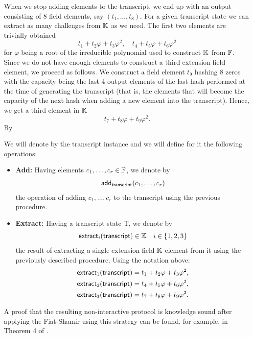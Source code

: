 When we stop adding elements to the transcript, we end up with an output consisting of $8$ field elements, say $(t_1, \dots, t_8)$. For a given transcript state we can extract as many challenges from $\mathbb{K}$ as we need. The first two elements are trivially obtained
\[
t_1 + t_2 \varphi + t_3 \varphi^2, \quad t_4 + t_5 \varphi + t_6 \varphi^2
\]
for $\varphi$ being a root of the irreducible polynomial used to construct $\mathbb{K}$ from $\mathbb{F}$. Since we do not have enough elements to construct a third extension field element, we proceed as follows. We construct a field element $t_9$ hashing $8$ zeros with the capacity being the last $4$ output elements of the last hash performed at the time of generating the transcript (that is, the elements that will become the capacity of the next hash when adding a new element into the transcript). Hence, we get a third element in $\mathbb{K}$
\[
t_7 + t_8 \varphi + t_9 \varphi^2.
\]
By 

We will denote by \transcript the transcript instance and we will define for it the following operations:

\begin{itemize}

\item \textbf{Add:} Having elements $c_1, \dots, c_r \in \mathbb{F}$, we denote by 
\[
\textsf{add}_{\textsf{transcript}}(c_1, \dots, c_r)
\]
the operation of adding $c_1, \dots, c_r$ to the transcript using the previous procedure. 

\item \textbf{Extract:} Having a transcript state \textsf{T}, we denote by
\[
\mathsf{extract}_{i}(\textsf{transcript}) \in \mathbb{K} \quad i \in \{1, 2, 3\}
\]
the result of extracting a single extension field $\mathbb{K}$ element from it using the previously described procedure. Using the notation above:
\begin{align*}
&\mathsf{extract}_{1}(\textsf{transcript}) = t_1 + t_2 \varphi + t_3 \varphi^2, \\
&\mathsf{extract}_{2}(\textsf{transcript}) = t_4 + t_5 \varphi + t_6 \varphi^2, \\
&\mathsf{extract}_{3}(\textsf{transcript}) = t_7 + t_8 \varphi + t_9 \varphi^2.
\end{align*}
\end{itemize}

A proof that the resulting non-interactive protocol is knowledge sound after applying the Fiat-Shamir using this strategy can be found, for example, in Theorem 4 of \cite{EPRINT:AttFehKlo21}.

